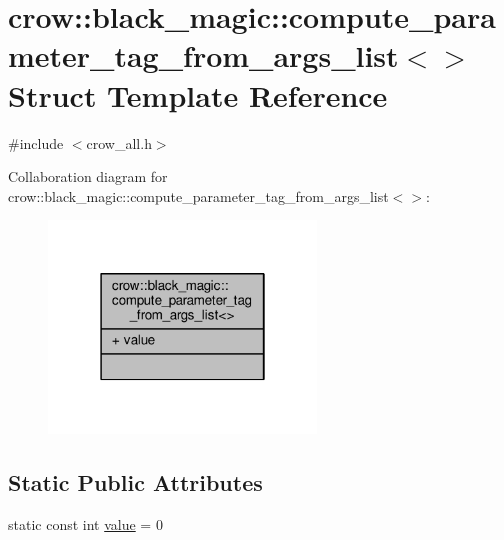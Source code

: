 \hypertarget{structcrow_1_1black__magic_1_1compute__parameter__tag__from__args__list_3_4}{\section{crow\-:\-:black\-\_\-magic\-:\-:compute\-\_\-parameter\-\_\-tag\-\_\-from\-\_\-args\-\_\-list$<$$>$ Struct Template Reference}
\label{structcrow_1_1black__magic_1_1compute__parameter__tag__from__args__list_3_4}
}


{\ttfamily \#include $<$crow\-\_\-all.\-h$>$}



Collaboration diagram for crow\-:\-:black\-\_\-magic\-:\-:compute\-\_\-parameter\-\_\-tag\-\_\-from\-\_\-args\-\_\-list$<$$>$\-:
\nopagebreak
\begin{figure}[H]
\begin{center}
\leavevmode
\includegraphics[width=202pt]{structcrow_1_1black__magic_1_1compute__parameter__tag__from__args__list_3_4__coll__graph}
\end{center}
\end{figure}
\subsection*{Static Public Attributes}
\begin{DoxyCompactItemize}
\item 
static const int \hyperlink{structcrow_1_1black__magic_1_1compute__parameter__tag__from__args__list_3_4_a45883ca903d54772d967f8ad7ac86324}{value} = 0
\end{DoxyCompactItemize}


